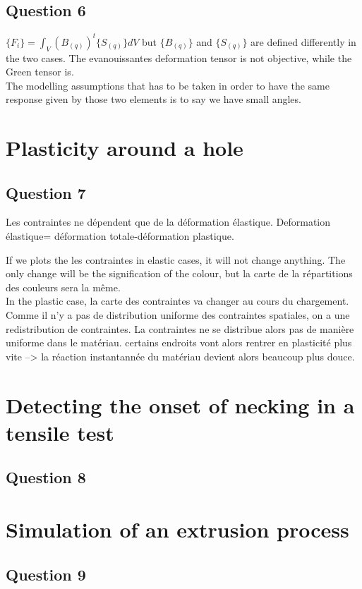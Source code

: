 \documentclass[12pt,a4paper]{article}
\begin{document}
\subsection*{Question 6}


$\{F_i\}=\int_{V} (B_{(q)})^t\{S_{(q)}\}dV$
but $\{B_{(q)}\}$ and $\{S_{(q)}\}$ are defined differently in the two cases.
The evanouissantes deformation tensor is not objective, while the Green tensor is.
\\The modelling assumptions that has to be taken in order to have the same response given by those two elements is to say we have small angles.



\section*{Plasticity around a hole}
\subsection*{Question 7}
Les contraintes ne dépendent que de la déformation élastique. Deformation élastique= déformation totale-déformation plastique.

If we plots the les contraintes in elastic cases, it will not change anything. The only change will be the signification of the colour, but la carte de la répartitions des couleurs sera la même.
\\In the plastic case, la carte des contraintes va changer au cours du chargement.
Comme il n'y a pas de distribution uniforme des contraintes spatiales, on a une redistribution de contraintes. La contraintes ne se distribue alors pas de manière uniforme dans le matériau. certains endroits vont alors rentrer en plasticité plus vite --> la réaction instantannée du matériau devient alors beaucoup plus douce.

\section*{Detecting the onset of necking in a tensile test
}

\subsection*{Question 8}

\section*{
Simulation of an extrusion process}
\subsection*{Question 9}
\end{document}
